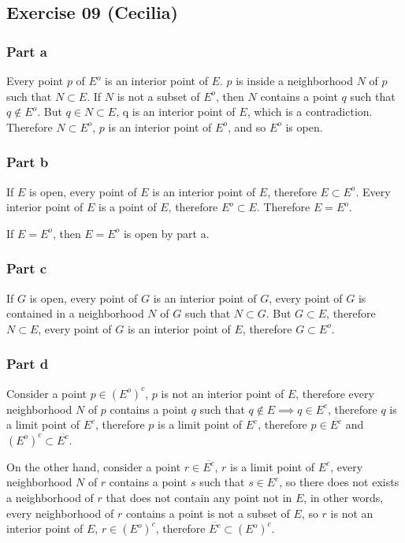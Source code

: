 \subsection*{Exercise 09 (Cecilia)}
\subsubsection*{Part a}
Every point $ p $ of $ E^o $ is an interior point of $ E $.
$ p $ is inside a neighborhood $ N $ of $ p $ such that $ N \subset E $.
If $ N $ is not a subset of $ E^o $, then $ N $ contains a point $ q $ such that $ q \notin E^o $.
But $ q \in N \subset E $, q is an interior point of $ E $, which is a contradiction.
Therefore $ N \subset E^o $, $ p $ is an interior point of $ E^o $, and so $ E^o $ is open.

\subsubsection*{Part b}
If $ E $ is open, every point of $ E $ is an interior point of $ E $, therefore $ E \subset E^o $.
Every interior point of $ E $ is a point of $ E $, therefore $ E^o \subset E $.
Therefore $ E = E^o $.

If $ E = E^o $, then $ E = E^o $ is open by part a.

\subsubsection*{Part c}
If $ G $ is open, every point of $ G $ is an interior point of $ G $, every point of $ G $ is contained in a neighborhood $ N $ of $ G $ such that $ N \subset G $.
But $ G \subset E $, therefore $ N \subset E $, every point of $ G $ is an interior point of $ E $, therefore $ G \subset E^o $.

\subsubsection*{Part d}
Consider a point $ p \in (E^o)^c $, $ p $ is not an interior point of $ E $, therefore every neighborhood $ N $ of $ p $ contains a point $ q $ such that $ q \notin E \implies q \in E^c $, therefore $ q $ is a limit point of $ E^c $, therefore $ p $ is a limit point of $ E^c $, therefore $ p \in \overline{E^c} $ and $ (E^o)^c \subset \overline{E^c} $.

On the other hand, consider a point $ r \in \overline{E^c} $, $ r $ is a limit point of $ E^c $, every neighborhood $ N $ of $ r $ contains a point $ s $ such that $ s \in E^c $, so there does not exists a neighborhood of $ r $ that does not contain any point not in $ E $, in other words, every neighborhood of $ r $ contains a point is not a subset of $ E $, so $ r $ is not an interior point of $ E $, $ r \in (E^o)^c $, therefore $ \overline{E^c} \subset (E^o)^c $.

